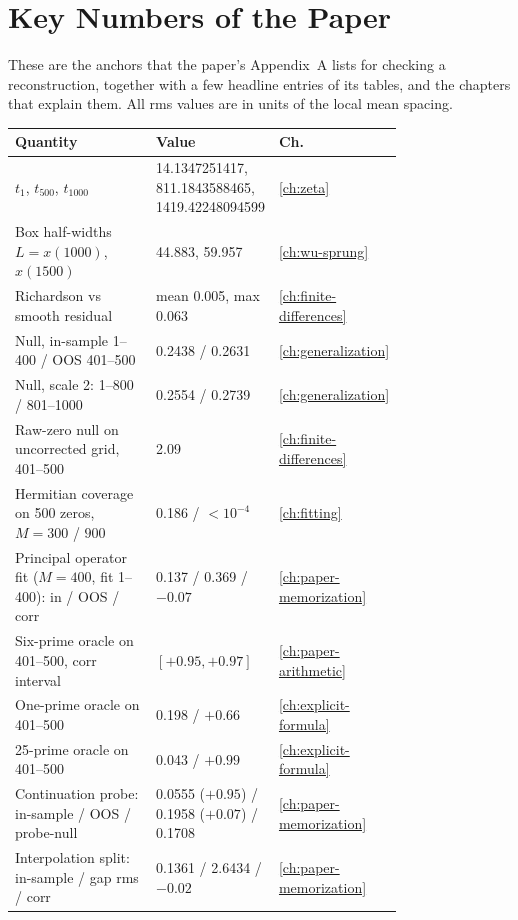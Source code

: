 \renewcommand{\chapterart}{ap-numbers}\renewcommand{\chapterartcaption}{The first nontrivial zero, $\tfrac12+14.134725141734693790\ldots\,i$.}
\chapter{Key Numbers of the Paper}\label{ch:ap-numbers}

These are the anchors that the paper's Appendix~A lists for checking a reconstruction, together with a few headline entries of its tables, and the chapters that explain them. All rms values are in units of the local mean spacing.

\begin{center}\small
\begin{tabular}{p{0.52\linewidth}p{0.25\linewidth}l}
\toprule
Quantity & Value & Ch.\\
\midrule
$t_1$, $t_{500}$, $t_{1000}$ & 14.1347251417, 811.1843588465, 1419.42248094599 & \ref{ch:zeta}\\
Box half-widths $L=x(1000)$, $x(1500)$ & 44.883, 59.957 & \ref{ch:wu-sprung}\\
Richardson vs smooth residual & mean 0.005, max 0.063 & \ref{ch:finite-differences}\\
Null, in-sample 1--400 / OOS 401--500 & 0.2438 / 0.2631 & \ref{ch:generalization}\\
Null, scale 2: 1--800 / 801--1000 & 0.2554 / 0.2739 & \ref{ch:generalization}\\
Raw-zero null on uncorrected grid, 401--500 & 2.09 & \ref{ch:finite-differences}\\
Hermitian coverage on 500 zeros, $M=300$ / $900$ & 0.186 / $<10^{-4}$ & \ref{ch:fitting}\\
Principal operator fit ($M=400$, fit 1--400): in / OOS / corr & 0.137 / 0.369 / $-0.07$ & \ref{ch:paper-memorization}\\
Six-prime oracle on 401--500, corr interval & $[+0.95,+0.97]$ & \ref{ch:paper-arithmetic}\\
One-prime oracle on 401--500 & 0.198 / $+0.66$ & \ref{ch:explicit-formula}\\
25-prime oracle on 401--500 & 0.043 / $+0.99$ & \ref{ch:explicit-formula}\\
Continuation probe: in-sample / OOS / probe-null & 0.0555 ($+0.95$) / 0.1958 ($+0.07$) / 0.1708 & \ref{ch:paper-memorization}\\
Interpolation split: in-sample / gap rms / corr & 0.1361 / 2.6434 / $-0.02$ & \ref{ch:paper-memorization}\\

\end{tabular}
\end{center}
